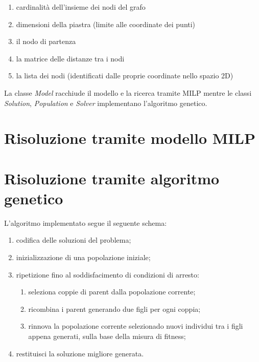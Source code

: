 \documentclass[12pt,a4paper]{article}
\begin{document}
        \begin{enumerate}
            \item cardinalit\`a dell'insieme dei nodi del grafo
            \item dimensioni della piastra (limite alle coordinate dei punti)
            \item il nodo di partenza
            \item la matrice delle distanze tra i nodi
            \item la lista dei nodi (identificati dalle proprie coordinate nello spazio 2D)
        \end{enumerate}

        La classe \emph{Model} racchiude il modello e la ricerca tramite MILP mentre le classi \emph{Solution}, \emph{Population} e \emph{Solver}
        implementano l'algoritmo genetico.
        
    \section{Risoluzione tramite modello MILP}

    \section{Risoluzione tramite algoritmo genetico}
        L'algoritmo implementato segue il seguente schema:
        \begin{enumerate}
            \item codifica delle soluzioni del problema;
            \item inizializzazione di una popolazione iniziale;
            \item ripetizione fino al soddisfacimento di condizioni di arresto:
                \begin{enumerate}
                    \item seleziona coppie di parent dalla popolazione corrente;
                    \item ricombina i parent generando due figli per ogni coppia;
                    \item rinnova la popolazione corrente selezionado nuovi individui
                        tra i figli appena generati, sulla base della misura di fitness;
                \end{enumerate}
            \item restituisci la soluzione migliore generata.
        \end{enumerate}
\end{document}
